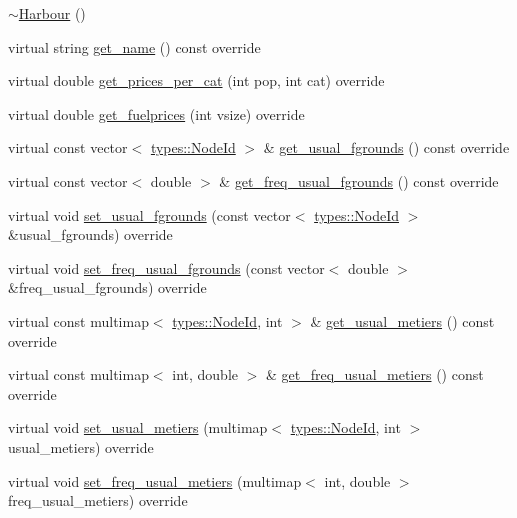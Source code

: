 \begin{DoxyCompactItemize}
\mbox{\hyperlink{class_harbour_a19531317d6f077172d96a77c09104c22}{$\sim$\+Harbour}} ()
\item 
virtual string \mbox{\hyperlink{class_harbour_a515714090da250f1a433185e8a57ce83}{get\+\_\+name}} () const override
\item 
virtual double \mbox{\hyperlink{class_harbour_a2eec3ef3caca2336f7d0579fd2ba6d73}{get\+\_\+prices\+\_\+per\+\_\+cat}} (int pop, int cat) override
\item 
virtual double \mbox{\hyperlink{class_harbour_aa7ca7b59418bb965fe0630cbe118eea4}{get\+\_\+fuelprices}} (int vsize) override
\item 
virtual const vector$<$ \mbox{\hyperlink{classtypes_1_1_node_id}{types\+::\+Node\+Id}} $>$ \& \mbox{\hyperlink{class_harbour_ad7369a9ec8a9032dbdd99e2d945415de}{get\+\_\+usual\+\_\+fgrounds}} () const override
\item 
virtual const vector$<$ double $>$ \& \mbox{\hyperlink{class_harbour_aa221dcf584dfc88a172c0aa890fee7ed}{get\+\_\+freq\+\_\+usual\+\_\+fgrounds}} () const override
\item 
virtual void \mbox{\hyperlink{class_harbour_a00ab27f3f0044f640da591821c735310}{set\+\_\+usual\+\_\+fgrounds}} (const vector$<$ \mbox{\hyperlink{classtypes_1_1_node_id}{types\+::\+Node\+Id}} $>$ \&usual\+\_\+fgrounds) override
\item 
virtual void \mbox{\hyperlink{class_harbour_ab64450e0c491deb6ac7927c27b9e45d6}{set\+\_\+freq\+\_\+usual\+\_\+fgrounds}} (const vector$<$ double $>$ \&freq\+\_\+usual\+\_\+fgrounds) override
\item 
virtual const multimap$<$ \mbox{\hyperlink{classtypes_1_1_node_id}{types\+::\+Node\+Id}}, int $>$ \& \mbox{\hyperlink{class_harbour_a4678c9c337d7253b47863ab3a252f3d4}{get\+\_\+usual\+\_\+metiers}} () const override
\item 
virtual const multimap$<$ int, double $>$ \& \mbox{\hyperlink{class_harbour_af10263daa61fa705e1bf4be8504eb652}{get\+\_\+freq\+\_\+usual\+\_\+metiers}} () const override
\item 
virtual void \mbox{\hyperlink{class_harbour_ab7446ddd7d8aa93a0655ce899232fa66}{set\+\_\+usual\+\_\+metiers}} (multimap$<$ \mbox{\hyperlink{classtypes_1_1_node_id}{types\+::\+Node\+Id}}, int $>$ usual\+\_\+metiers) override
\item 
virtual void \mbox{\hyperlink{class_harbour_a9c91424f1d691474c5db9b55a90dc2e6}{set\+\_\+freq\+\_\+usual\+\_\+metiers}} (multimap$<$ int, double $>$ freq\+\_\+usual\+\_\+metiers) override
\item 

\end{DoxyCompactItemize}
